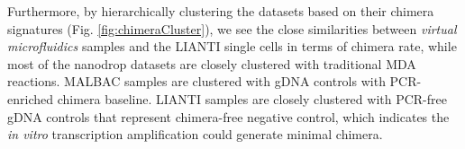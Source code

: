 Furthermore, by hierarchically clustering the datasets based on their chimera signatures (Fig. \ref{fig:chimeraCluster}), we see the close similarities between \textit{virtual microfluidics} samples and the LIANTI single cells in terms of chimera rate, while most of the nanodrop datasets are closely clustered with traditional MDA reactions. MALBAC samples are clustered with gDNA controls with PCR-enriched chimera baseline. LIANTI samples are closely clustered with PCR-free gDNA controls that represent chimera-free negative control, which indicates the \textit{in vitro} transcription amplification could generate minimal chimera. 


